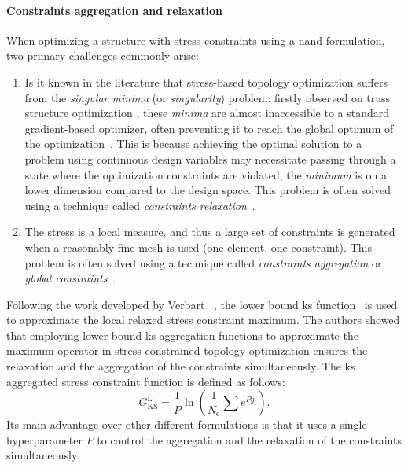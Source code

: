 \paragraph{Constraints aggregation and relaxation}
When optimizing a structure with stress constraints using a \gls{nand} formulation, two primary challenges commonly arise:
\begin{enumerate}[label=(\roman*)]
    \item Is it known in the literature  that stress-based topology optimization suffers from the \textit{singular minima} (or \textit{singularity}) problem: firstly observed on truss structure optimization , these \textit{minima} are almost inaccessible to a standard gradient-based optimizer, often preventing it to reach the global optimum of the optimization~\cite{rozvany_design-dependent_2001}. This is because achieving the optimal solution to a problem using continuous design variables may necessitate passing through a state where the optimization constraints are violated, \ie the \textit{minimum} is on a lower dimension compared to the design space. This problem is often solved using a technique called \textit{constraints relaxation}~.

    \item The stress is a local measure, and thus a large set of constraints is generated when a reasonably fine mesh is used (one element, one constraint). This problem is often solved using a technique called \textit{constraints aggregation} or \textit{global constraints}~.
\end{enumerate} 

Following the work developed by Verbart \etal~, the lower bound \gls{ks} function~ is used to approximate the local relaxed stress constraint maximum. The authors showed that employing lower-bound \gls{ks} aggregation functions to approximate the maximum operator in stress-constrained topology optimization ensures the relaxation and the aggregation of the constraints simultaneously. The \gls{ks} aggregated stress constraint function is defined as follows:
\begin{equation} 
    G_{\text{KS}}^\text{L} = \frac{1}{P} \ln{\left( \frac{1}{N_\text{e}} \sum e^{{P}\bar{g}_i} \right)}.
    \label{eq:03_gksl}
\end{equation}
Its main advantage over other different formulations is that it uses a single hyperparameter $P$ to control the aggregation and the relaxation of the constraints simultaneously.

